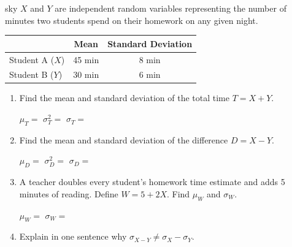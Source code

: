 \documentclass[10pt]{article}
\begin{document}
\namedateperiod

\vspace{0.14in}

\begin{scenariobox}[Context]{sky}
\small
$X$ and $Y$ are independent random variables representing the number of minutes two
students spend on their homework on any given night.
\begin{center}
\renewcommand{\arraystretch}{1.3}
\begin{tabular}{@{}lcc@{}}
& \textbf{Mean} & \textbf{Standard Deviation} \\
\hline
Student A ($X$) & 45 min & 8 min \\
Student B ($Y$) & 30 min & 6 min \\
\end{tabular}
\end{center}
\end{scenariobox}

\vspace{0.1in}

\begin{practicebox}
\small
\begin{enumerate}[leftmargin=1.5em, itemsep=12pt]
  \item Find the mean and standard deviation of the total time $T = X + Y$.

        $\mu_T = $ \blank{3cm} \quad $\sigma^2_T = $ \blank{4cm} \quad $\sigma_T = $ \blank{3cm}

  \item Find the mean and standard deviation of the difference $D = X - Y$.

        $\mu_D = $ \blank{3cm} \quad $\sigma^2_D = $ \blank{4cm} \quad $\sigma_D = $ \blank{3cm}

  \item A teacher doubles every student's homework time estimate and adds 5 minutes of
        reading. Define $W = 5 + 2X$. Find $\mu_W$ and $\sigma_W$.

        $\mu_W = $ \blank{3cm} \quad $\sigma_W = $ \blank{3cm}

  \item Explain in one sentence why $\sigma_{X-Y} \ne \sigma_X - \sigma_Y$.\\
        \writeline\\[1pt]\writeline
\end{enumerate}
\end{practicebox}
\end{document}

